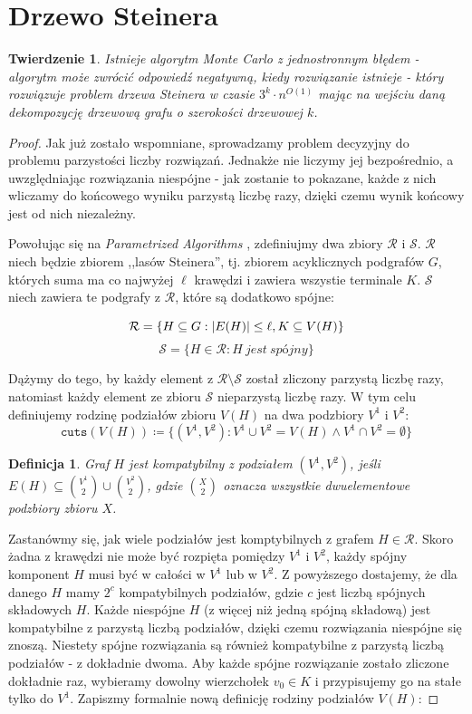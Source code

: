 \documentclass[12pt, oneside]{report}
\newtheorem{theorem}{Twierdzenie}
\newtheorem{definition}{Definicja}
\newcommand\Omicron{O}
\begin{document}
    	\section{Drzewo Steinera}


\begin{theorem}
\label{monte_carlo}
\em Istnieje algorytm Monte Carlo z jednostronnym błędem - algorytm może zwrócić odpowiedź negatywną, kiedy rozwiązanie istnieje - który rozwiązuje problem drzewa Steinera w czasie $3^k \cdot n^{\Omicron(1)}$ mając na wejściu daną dekompozycję drzewową grafu o szerokości drzewowej $k$.
\end{theorem}

\begin{proof}
Jak już zostało wspomniane, sprowadzamy problem decyzyjny do problemu parzystości liczby rozwiązań. Jednakże nie liczymy jej bezpośrednio, a uwzględniając rozwiązania niespójne - jak zostanie to pokazane, każde z nich wliczamy do końcowego wyniku parzystą liczbę razy, dzięki czemu wynik końcowy jest od nich niezależny.

Powołując się na \emph{Parametrized Algorithms} \cite{parametrized_algorithms}, zdefiniujmy dwa zbiory $\mathcal{R}$ i $\mathcal{S}$. $\mathcal{R}$ niech będzie zbiorem ,,lasów Steinera'', tj. zbiorem acyklicznych podgrafów $G$, których suma ma co najwyżej $\ell$ krawędzi i zawiera wszystie terminale $K$. $\mathcal{S}$ niech zawiera te podgrafy z $\mathcal{R}$, które są dodatkowo spójne:

$$\mathcal{R} = \{H \subseteq G: \abs{E(H)} \leq \ell, K \subseteq V(H)\}$$
$$\mathcal{S} = \{H \in \mathcal{R}: H\ jest\ sp\mbox{ó}jny\}$$

Dążymy do tego, by każdy element z $\mathcal{R} \setminus \mathcal{S}$ został zliczony parzystą liczbę razy, natomiast każdy element ze zbioru $\mathcal{S}$ nieparzystą liczbę razy. W tym celu definiujemy rodzinę podziałów zbioru $V(H)$ na dwa podzbiory $V^1$ i $V^2$:
$$\texttt{cuts} (V(H)) \coloneqq \{(V^1, V^2): V^1 \cup V^2 = V(H) \wedge V^1 \cap V^2 = \emptyset\}$$
\begin{definition}
\em \emph{Graf $H$ jest kompatybilny z podziałem $(V^1, V^2)$}, jeśli $E(H) \subseteq {V^1 \choose 2} \cup {V^2 \choose 2}$, gdzie ${X \choose 2}$ oznacza wszystkie dwuelementowe podzbiory zbioru $X$.  
\end{definition}

Zastanówmy się, jak wiele podziałów jest komptybilnych z grafem $H \in \mathcal{R}$. Skoro żadna z krawędzi nie może być rozpięta pomiędzy $V^1$ i $V^2$, każdy spójny komponent $H$ musi być w całości w $V^1$ lub w $V^2$. Z powyższego dostajemy, że dla danego $H$ mamy $2^c$ kompatybilnych podziałów, gdzie $c$ jest liczbą spójnych składowych $H$. Każde niespójne $H$ (z więcej niż jedną spójną składową) jest kompatybilne z parzystą liczbą podziałów, dzięki czemu rozwiązania niespójne się znoszą. Niestety spójne rozwiązania są również kompatybilne z parzystą liczbą podziałów - z dokładnie dwoma. Aby każde spójne rozwiązanie zostało zliczone dokładnie raz, wybieramy dowolny wierzchołek $v_0 \in K$ i przypisujemy go na stałe tylko do $V^1$. Zapiszmy formalnie nową definicję rodziny podziałów $V(H)$:


\end{proof}
\end{document}
